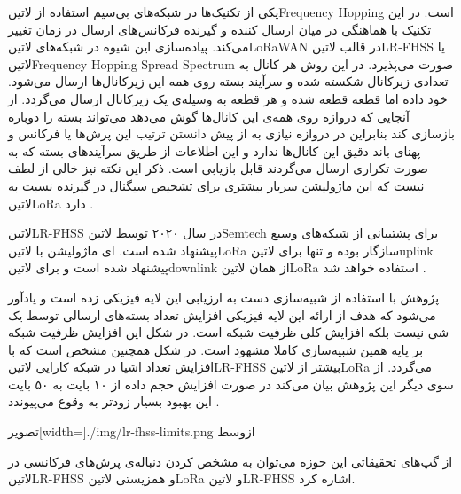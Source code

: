 
یکی از تکنیک‌ها در شبکه‌های بی‌سیم استفاده از ‌لاتین{Frequency Hopping} است. در این تکنیک با هماهنگی در میان ارسال کننده و گیرنده فرکانس‌های ارسال در زمان
تغییر می‌کند. پیاده‌سازی این شیوه در شبکه‌های ‌لاتین{LoRaWAN} در قالب ‌لاتین{LR-FHSS} یا
‌لاتین{Frequency Hopping Spread Spectrum}
صورت می‌پذیرد. در این روش هر کانال به تعدادی زیرکانال شکسته شده و سرآیند بسته روی همه این زیرکانال‌ها ارسال می‌شود.
خود داده اما قطعه قطعه شده و هر قطعه به وسیله‌ی یک زیرکانال ارسال می‌گردد.
از آنجایی که دروازه روی همه‌ی این کانال‌ها گوش می‌دهد می‌تواند بسته را دوباره بازسازی کند بنابراین
در دروازه نیازی به از پیش دانستن ترتیب این پرش‌ها یا فرکانس و پهنای باند دقیق این کانال‌ها ندارد
و این اطلاعات از طریق سرآیندهای بسته که به صورت تکراری ارسال می‌گردند قابل بازیابی است.
ذکر این نکته نیز خالی از لطف نیست که این ماژولیشن سربار بیشتری برای تشخیص سیگنال در گیرنده نسبت به ‌لاتین{LoRa} دارد
.

‌لاتین{LR-FHSS} در سال ۲۰۲۰ توسط ‌لاتین{Semtech} برای پشتیبانی از شبکه‌های وسیع پیشنهاد شده است.
ای ماژولیشن با ‌لاتین{LoRa} سازگار بوده و تنها برای ‌لاتین{uplink} پیشنهاد شده است و برای ‌لاتین{downlink} از همان
‌لاتین{LoRa} استفاده خواهد شد
.

پژوهش  با استفاده از شبیه‌سازی دست به ارزیابی این لایه فیزیکی زده است و یادآور می‌شود که هدف از ارائه این لایه فیزیکی
افزایش تعداد بسته‌های ارسالی توسط یک شی نیست بلکه افزایش کلی ظرفیت شبکه است. در شکل  این افزایش ظرفیت شبکه بر پایه همین
شبیه‌سازی کاملا مشهود است. در شکل  همچنین مشخص است که با افزایش تعداد اشیا در شبکه کارایی ‌لاتین{LR-FHSS} بیشتر از ‌لاتین{LoRa}
می‌گردد. از سوی دیگر این پژوهش بیان می‌کند در صورت افزایش حجم داده از ۱۰ بایت به ۵۰ بایت این بهبود بسیار زودتر به وقوع می‌پیوندد
.

‌تصویر[width=\textwidth]{./img/lr-fhss-limits.png}
‌ازوسط

از گپ‌های تحقیقاتی این حوزه می‌توان به مشخص کردن دنباله‌ی پرش‌های فرکانسی در ‌لاتین{LR-FHSS} و همزیستی ‌لاتین{LoRa} و ‌لاتین{LR-FHSS} اشاره کرد.


